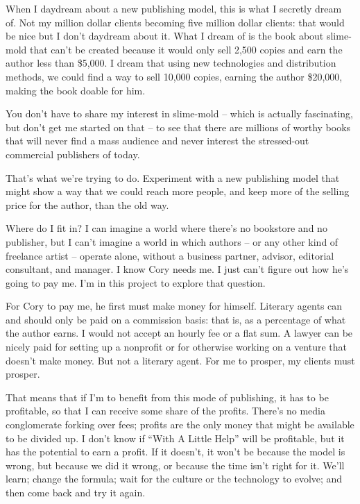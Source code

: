 When I daydream about a new publishing model, this is what I secretly 
dream of. Not my million dollar clients becoming five million dollar 
clients: that would be nice but I don't daydream about it. What I dream 
of is the book about slime-mold that can't be created because it would 
only sell 2,500 copies and earn the author less than \$5,000. I dream 
that using new technologies and distribution methods, we could find a 
way to sell 10,000 copies, earning the author \$20,000, making the book 
doable for him.

You don't have to share my interest in slime-mold -- which is actually 
fascinating, but don't get me started on that -- to see that there are 
millions of worthy books that will never find a mass audience and never 
interest the stressed-out commercial publishers of today.

That's what we're trying to do. Experiment with a new publishing model 
that might show a way that we could reach more people, and keep more of 
the selling price for the author, than the old way.

Where do I fit in? I can imagine a world where there's no bookstore and 
no publisher, but I can't imagine a world in which authors -- or any 
other kind of freelance artist -- operate alone, without a business 
partner, advisor, editorial consultant, and manager. I know Cory needs 
me. I just can't figure out how he's going to pay me. I'm in this 
project to explore that question.

For Cory to pay me, he first must make money for himself. Literary 
agents can and should only be paid on a commission basis: that is, as a 
percentage of what the author earns. I would not accept an hourly fee 
or a flat sum. A lawyer can be nicely paid for setting up a nonprofit 
or for otherwise working on a venture that doesn't make money. But not 
a literary agent. For me to prosper, my clients must prosper.

That means that if I'm to benefit from this mode of publishing, it has 
to be profitable, so that I can receive some share of the profits. 
There's no media conglomerate forking over fees; profits are the only 
money that might be available to be divided up. I don't know if “With 
A Little Help” will be profitable, but it has the potential to earn a 
profit. If it doesn't, it won't be because the model is wrong, but 
because we did it wrong, or because the time isn't right for it. We'll 
learn; change the formula; wait for the culture or the technology to 
evolve; and then come back and try it again.

